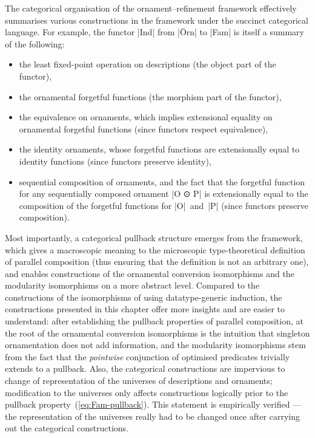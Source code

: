 The categorical organisation of the ornament--refinement framework effectively summarises various constructions in the framework under the succinct categorical language.
For example, the functor |Ind| from |Ōrn| to |Fam| is itself a summary of the following:
\begin{itemize}
\item the least fixed-point operation on descriptions (the object part of the functor),
\item the ornamental forgetful functions (the morphism part of the functor),
\item the equivalence on ornaments, which implies extensional equality on ornamental forgetful functions (since functors respect equivalence),
\item the identity ornaments, whose forgetful functions are extensionally equal to identity functions (since functors preserve identity),
\item sequential composition of ornaments, and the fact that the forgetful function for any sequentially composed ornament |O ⊙ P| is extensionally equal to the composition of the forgetful functions for |O|~and~|P| (since functors preserve composition).
\end{itemize}
Most importantly, a categorical pullback structure emerges from the framework, which gives a macroscopic meaning to the microscopic type-theoretical definition of parallel composition (thus ensuring that the definition is not an arbitrary one), and enables constructions of the ornamental conversion isomorphisms and the modularity isomorphisms on a more abstract level.
Compared to the constructions of the isomorphisms of \citet{Ko-pcOrn} using datatype-generic induction, the constructions presented in this chapter offer more insights and are easier to understand: after establishing the pullback properties of parallel composition, at the root of the ornamental conversion isomorphisms is the intuition that singleton ornamentation does not add information, and the modularity isomorphisms stem from the fact that the \emph{pointwise} conjunction of optimised predicates trivially extends to a pullback.
Also, the categorical constructions are impervious to change of representation of the universes of descriptions and ornaments; modification to the universes only affects constructions logically prior to the pullback property~(\ref{eq:Fam-pullback}).
This statement is empirically verified --- the representation of the universes really had to be changed once after carrying out the categorical constructions.

